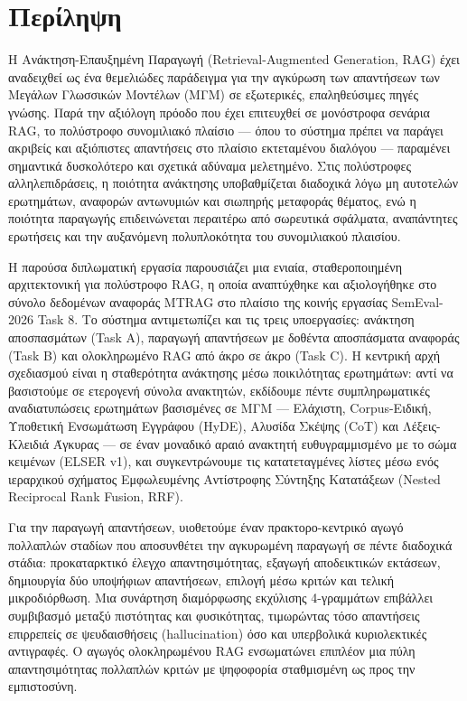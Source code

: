 \chapter*{Περίληψη}

Η Ανάκτηση-Επαυξημένη Παραγωγή (Retrieval-Augmented Generation, RAG) έχει αναδειχθεί
ως ένα θεμελιώδες παράδειγμα για την αγκύρωση των απαντήσεων των Μεγάλων Γλωσσικών
Μοντέλων (ΜΓΜ) σε εξωτερικές, επαληθεύσιμες πηγές γνώσης. Παρά την αξιόλογη πρόοδο
που έχει επιτευχθεί σε μονόστροφα σενάρια RAG, το πολύστροφο συνομιλιακό πλαίσιο
— όπου το σύστημα πρέπει να παράγει ακριβείς και αξιόπιστες απαντήσεις στο πλαίσιο
εκτεταμένου διαλόγου — παραμένει σημαντικά δυσκολότερο και σχετικά αδύναμα μελετημένο.
Στις πολύστροφες αλληλεπιδράσεις, η ποιότητα ανάκτησης υποβαθμίζεται διαδοχικά λόγω
μη αυτοτελών ερωτημάτων, αναφορών αντωνυμιών και σιωπηρής μεταφοράς θέματος, ενώ
η ποιότητα παραγωγής επιδεινώνεται περαιτέρω από σωρευτικά σφάλματα, αναπάντητες
ερωτήσεις και την αυξανόμενη πολυπλοκότητα του συνομιλιακού πλαισίου.
 
Η παρούσα διπλωματική εργασία παρουσιάζει μια ενιαία, σταθεροποιημένη αρχιτεκτονική
για πολύστροφο RAG, η οποία αναπτύχθηκε και αξιολογήθηκε στο σύνολο δεδομένων
αναφοράς MTRAG στο πλαίσιο της κοινής εργασίας SemEval-2026 Task 8. Το σύστημα
αντιμετωπίζει και τις τρεις υποεργασίες: ανάκτηση αποσπασμάτων (Task A),
παραγωγή απαντήσεων με δοθέντα αποσπάσματα αναφοράς (Task B) και ολοκληρωμένο
RAG από άκρο σε άκρο (Task C). Η κεντρική αρχή σχεδιασμού είναι η σταθερότητα
ανάκτησης μέσω ποικιλότητας ερωτημάτων: αντί να βασιστούμε σε ετερογενή σύνολα
ανακτητών, εκδίδουμε πέντε συμπληρωματικές αναδιατυπώσεις ερωτημάτων βασισμένες
σε ΜΓΜ — Ελάχιστη, Corpus-Ειδική, Υποθετική Ενσωμάτωση Εγγράφου (HyDE), Αλυσίδα
Σκέψης (CoT) και Λέξεις-Κλειδιά Άγκυρας — σε έναν μοναδικό αραιό ανακτητή
ευθυγραμμισμένο με το σώμα κειμένων (ELSER v1), και συγκεντρώνουμε τις κατατεταγμένες
λίστες μέσω ενός ιεραρχικού σχήματος Εμφωλευμένης Αντίστροφης Σύντηξης Κατατάξεων
(Nested Reciprocal Rank Fusion, RRF).
 
Για την παραγωγή απαντήσεων, υιοθετούμε έναν πρακτορο-κεντρικό αγωγό πολλαπλών
σταδίων που αποσυνθέτει την αγκυρωμένη παραγωγή σε πέντε διαδοχικά στάδια:
προκαταρκτικό έλεγχο απαντησιμότητας, εξαγωγή αποδεικτικών εκτάσεων, δημιουργία δύο
υποψήφιων απαντήσεων, επιλογή μέσω κριτών και τελική μικροδιόρθωση. Μια συνάρτηση
διαμόρφωσης εκχύλισης 4-γραμμάτων επιβάλλει συμβιβασμό μεταξύ πιστότητας και
φυσικότητας, τιμωρώντας τόσο απαντήσεις επιρρεπείς σε ψευδαισθήσεις (hallucination)
όσο και υπερβολικά κυριολεκτικές αντιγραφές. Ο αγωγός ολοκληρωμένου RAG ενσωματώνει
επιπλέον μια πύλη απαντησιμότητας πολλαπλών κριτών με ψηφοφορία σταθμισμένη ως
προς την εμπιστοσύνη.
 
